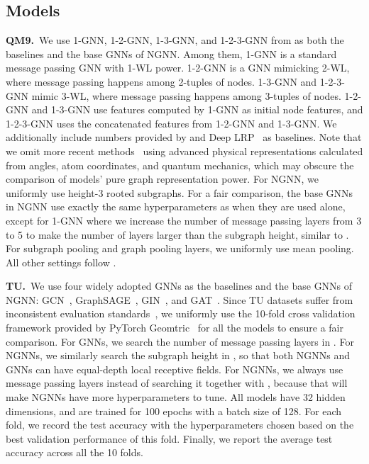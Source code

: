 \documentclass{article}
\begin{document}
\subsection{Models}
\textbf{QM9.}~We use 1-GNN, 1-2-GNN, 1-3-GNN, and 1-2-3-GNN from \citep{morris2019weisfeiler} as both the baselines and the base GNNs of NGNN. Among them, 1-GNN is a standard message passing GNN with 1-WL power. 1-2-GNN is a GNN mimicking 2-WL, where message passing happens among 2-tuples of nodes. 1-3-GNN and 1-2-3-GNN mimic 3-WL, where message passing happens among 3-tuples of nodes. 1-2-GNN and 1-3-GNN use features computed by 1-GNN as initial node features, and 1-2-3-GNN uses the concatenated features from 1-2-GNN and 1-3-GNN. We additionally include numbers provided by \citep{wu2018moleculenet} and Deep LRP~\citep{chen2020can} as baselines. Note that we omit more recent methods~\citep{anderson2019cormorant,klicpera2020directional,qiao2020orbnet} using advanced physical representations calculated from angles, atom coordinates, and quantum mechanics, which may obscure the comparison of models' pure graph representation power. For NGNN, we uniformly use height-3 rooted subgraphs. For a fair comparison, the base GNNs in NGNN use exactly the same hyperparameters as when they are used alone, except for 1-GNN where we increase the number of message passing layers from 3 to 5 to make the number of layers larger than the subgraph height, similar to \citep{zeng2020deep}. For subgraph pooling and graph pooling layers, we uniformly use mean pooling. All other settings follow \citep{morris2019weisfeiler}.








\textbf{TU.}~We use four widely adopted GNNs as the baselines and the base GNNs of NGNN: GCN~\citep{kipf2016semi}, GraphSAGE~\citep{hamilton2017inductive}, GIN~\citep{xu2018powerful}, and GAT~\citep{velivckovic2017graph}. Since TU datasets suffer from inconsistent evaluation standards~\citep{errica2019fair}, we uniformly use the 10-fold cross validation framework provided by PyTorch Geomtric~\citep{Fey/Lenssen/2019} for all the models to ensure a fair comparison. For GNNs, we search the number of message passing layers in . For NGNNs, we similarly search the subgraph height  in , so that both NGNNs and GNNs can have equal-depth local receptive fields. For NGNNs, we always use  message passing layers instead of searching it together with , because that will make NGNNs have more hyperparameters to tune. All models have 32 hidden dimensions, and are trained for 100 epochs with a batch size of 128. For each fold, we record the test accuracy with the hyperparameters chosen based on the best validation performance of this fold. Finally, we report the average test accuracy across all the 10 folds.
\end{document}
